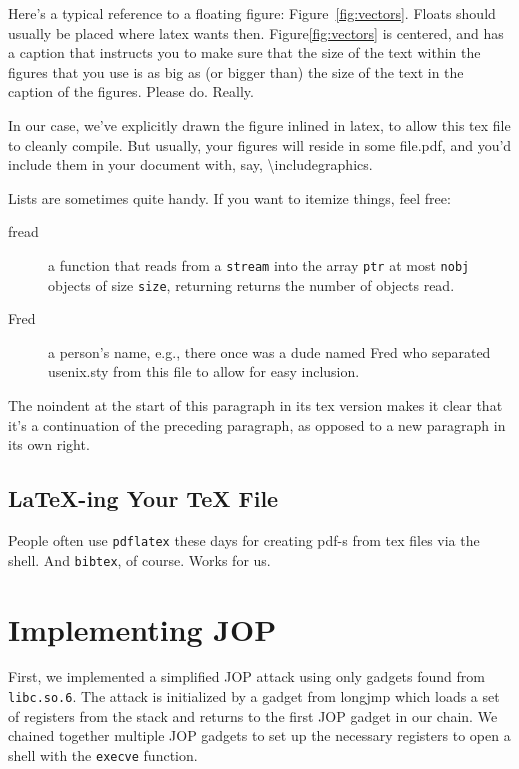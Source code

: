 Here's a typical reference to a floating figure:
Figure~\ref{fig:vectors}. Floats should usually be placed where latex
wants then. Figure\ref{fig:vectors} is centered, and has a caption
that instructs you to make sure that the size of the text within the
figures that you use is as big as (or bigger than) the size of the
text in the caption of the figures. Please do. Really.

In our case, we've explicitly drawn the figure inlined in latex, to
allow this tex file to cleanly compile. But usually, your figures will
reside in some file.pdf, and you'd include them in your document
with, say, \textbackslash{}includegraphics.

Lists are sometimes quite handy. If you want to itemize things, feel
free:

\begin{description}
  
\item[fread] a function that reads from a \texttt{stream} into the
  array \texttt{ptr} at most \texttt{nobj} objects of size
  \texttt{size}, returning returns the number of objects read.

\item[Fred] a person's name, e.g., there once was a dude named Fred
  who separated usenix.sty from this file to allow for easy
  inclusion.
\end{description}

\noindent
The noindent at the start of this paragraph in its tex version makes
it clear that it's a continuation of the preceding paragraph, as
opposed to a new paragraph in its own right.


\subsection{LaTeX-ing Your TeX File}

People often use \texttt{pdflatex} these days for creating pdf-s from
tex files via the shell. And \texttt{bibtex}, of course. Works for us.

\section{Implementing JOP}

First, we implemented a simplified JOP attack using only gadgets found from \verb|libc.so.6|.
The attack is initialized by a gadget from longjmp which loads a set of registers from the stack
and returns to the first JOP gadget in our chain. We chained together multiple JOP gadgets
to set up the necessary registers to open a shell with the \verb|execve| function.

